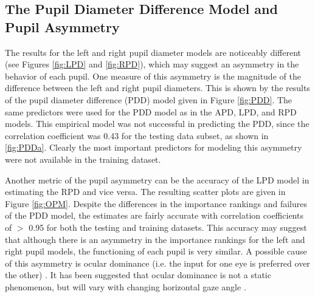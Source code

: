 \documentclass[10pt]{article}
\begin{document}
\subsection{The Pupil Diameter Difference Model and Pupil Asymmetry}

The results for the left and right pupil diameter models are noticeably different (see Figures \ref{fig:LPD} and \ref{fig:RPD}), which may suggest an asymmetry in the behavior of each pupil. One measure of this asymmetry is the magnitude of the difference between the left and right pupil diameters. This is shown by the results of the pupil diameter difference (PDD) model given in Figure \ref{fig:PDD}. The same predictors were used for the PDD model as in the APD, LPD, and RPD models. This empirical model was not successful in predicting the PDD, since the correlation coefficient was 0.43 for the testing data subset, as shown in \ref{fig:PDDa}. Clearly the most important predictors for modeling this asymmetry were not available in the training dataset. 

Another metric of the pupil asymmetry can be the accuracy of the LPD model in estimating the RPD and vice versa. The resulting scatter plots are given in Figure \ref{fig:OPM}. Despite the differences in the importance rankings and failures of the PDD model, the estimates are fairly accurate with correlation coefficients of $>$ 0.95 for both the testing and training datasets. This accuracy may suggest that although there is an asymmetry in the importance rankings for the left and right pupil models, the functioning of each pupil is very similar. A possible cause of this asymmetry is ocular dominance (i.e. the input for one eye is preferred over the other) \cite{OcularDom1, OcularDom2}. It has been suggested that ocular dominance is not a static phenomenon, but will vary with changing horizontal gaze angle \cite{OcularDomAngle}. 
\end{document}
